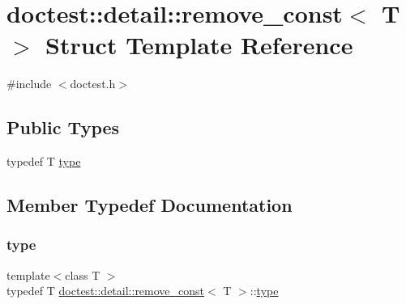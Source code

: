 \hypertarget{structdoctest_1_1detail_1_1remove__const}{}\section{doctest\+:\+:detail\+:\+:remove\+\_\+const$<$ T $>$ Struct Template Reference}
\label{structdoctest_1_1detail_1_1remove__const}


{\ttfamily \#include $<$doctest.\+h$>$}

\subsection*{Public Types}
\begin{DoxyCompactItemize}
\item 
typedef T \hyperlink{structdoctest_1_1detail_1_1remove__const_ad6a97a5d2fcb5f513bbff8ea12e280f8}{type}
\end{DoxyCompactItemize}


\subsection{Member Typedef Documentation}
\mbox{\label{structdoctest_1_1detail_1_1remove__const_ad6a97a5d2fcb5f513bbff8ea12e280f8}} 
\subsubsection{\texorpdfstring{type}{type}}
{\footnotesize\ttfamily template$<$class T $>$ \\
typedef T \hyperlink{structdoctest_1_1detail_1_1remove__const}{doctest\+::detail\+::remove\+\_\+const}$<$ T $>$\+::\hyperlink{structdoctest_1_1detail_1_1remove__const_ad6a97a5d2fcb5f513bbff8ea12e280f8}{type}}

